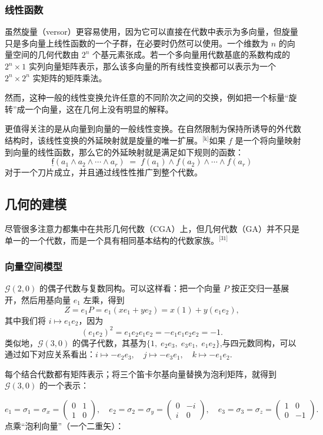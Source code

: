 \subsubsection{线性函数}
虽然旋量（versor）更容易使用，因为它可以直接在代数中表示为多向量，但旋量只是多向量上线性函数的一个子群，在必要时仍然可以使用。一个维数为 $n$ 的向量空间的几何代数由 $2^{n}$ 个基元素张成。若一个多向量用代数基底的系数构成的 $2^{n} \times 1$ 实列向量矩阵表示，那么该多向量的所有线性变换都可以表示为一个 $2^{n} \times 2^{n}$ 实矩阵的矩阵乘法。

然而，这种一般的线性变换允许任意的不同阶次之间的交换，例如把一个标量“旋转”成一个向量，这在几何上没有明显的解释。

更值得关注的是从向量到向量的一般线性变换。在自然限制为保持所诱导的外代数结构时，该线性变换的外延映射就是旋量的唯一扩展。\(^\text{[k]}\)如果 $f$ 是一个将向量映射到向量的线性函数，那么它的外延映射就是满足如下规则的函数：
$$
\underline{\mathsf{f}}(a_{1}\wedge a_{2}\wedge \cdots \wedge a_{r}) \;=\; f(a_{1}) \wedge f(a_{2}) \wedge \cdots \wedge f(a_{r})~
$$
对于一个刀片成立，并且通过线性性推广到整个代数。
\subsection{几何的建模}
尽管很多注意力都集中在共形几何代数（CGA）上，但几何代数（GA）并不只是单一的一个代数，而是一个具有相同基本结构的代数家族。\(^\text{[31]}\)
\subsubsection{向量空间模型}
$\mathcal{G}(2,0)$ 的偶子代数与复数同构。可以这样看：把一个向量 $P$ 按正交归一基展开，然后用基向量 $e_{1}$ 左乘，得到
$$
Z = e_{1}P = e_{1}(x e_{1} + y e_{2}) = x(1) + y(e_{1}e_{2}),~
$$
其中我们将 $i \mapsto e_{1}e_{2}$，因为
$$
(e_{1}e_{2})^{2} = e_{1}e_{2}e_{1}e_{2} = -e_{1}e_{1}e_{2}e_{2} = -1.~
$$
类似地，$\mathcal{G}(3,0)$ 的偶子代数，其基为$\{1, \; e_{2}e_{3}, \; e_{3}e_{1}, \; e_{1}e_{2}\}$,与四元数同构，可以通过如下对应关系看出：$i \mapsto -e_{2}e_{3}, \quad j \mapsto -e_{3}e_{1}, \quad k \mapsto -e_{1}e_{2}$.

每个结合代数都有矩阵表示；将三个笛卡尔基向量替换为泡利矩阵，就得到 $\mathcal{G}(3,0)$ 的一个表示：

$$
e_{1} = \sigma_{1} = \sigma_{x} =
\begin{pmatrix}
0 & 1 \\
1 & 0
\end{pmatrix}, \quad
e_{2} = \sigma_{2} = \sigma_{y} =
\begin{pmatrix}
0 & -i \\
i & 0
\end{pmatrix}, \quad
e_{3} = \sigma_{3} = \sigma_{z} =
\begin{pmatrix}
1 & 0 \\
0 & -1
\end{pmatrix}.~
$$
点乘“泡利向量”（一个二重矢）：

